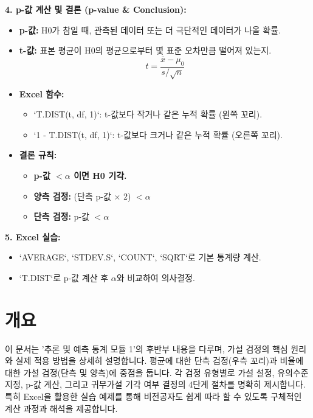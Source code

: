 \documentclass[11pt,a4paper]{article}
\begin{document}
\begin{tcolorbox}[colback=summarycolor, colframe=blue!75!black, title=\textbf{모듈 1 핵심 요약: 가설 검정의 기초}]
\textbf{4. p-값 계산 및 결론 (p-value & Conclusion):}
\begin{itemize}
    \item \textbf{p-값:} H0가 참일 때, 관측된 데이터 또는 더 극단적인 데이터가 나올 확률.
    \item \textbf{t-값:} 표본 평균이 H0의 평균으로부터 몇 표준 오차만큼 떨어져 있는지.
        \[ t = \frac{\bar{x} - \mu_0}{s / \sqrt{n}} \]
    \item \textbf{Excel 함수:}
        \begin{itemize}
            \item `T.DIST(t, df, 1)`: t-값보다 작거나 같은 누적 확률 (왼쪽 꼬리).
            \item `1 - T.DIST(t, df, 1)`: t-값보다 크거나 같은 누적 확률 (오른쪽 꼬리).
        \end{itemize}
    \item \textbf{결론 규칙:}
        \begin{itemize}
            \item \textbf{p-값 $< \alpha$ 이면 H0 기각.}
            \item \textbf{양측 검정:} (단측 p-값 $\times$ 2) $< \alpha$
            \item \textbf{단측 검정:} p-값 $< \alpha$
        \end{itemize}
\end{itemize}

\textbf{5. Excel 실습:}
\begin{itemize}
    \item `AVERAGE`, `STDEV.S`, `COUNT`, `SQRT`로 기본 통계량 계산.
    \item `T.DIST`로 p-값 계산 후 $\alpha$와 비교하여 의사결정.
\end{itemize}
\end{tcolorbox}

\newpage

\newpage
\section*{개요}
이 문서는 '추론 및 예측 통계 모듈 1'의 후반부 내용을 다루며, 가설 검정의 핵심 원리와 실제 적용 방법을 상세히 설명합니다. 평균에 대한 단측 검정(우측 꼬리)과 비율에 대한 가설 검정(단측 및 양측)에 중점을 둡니다. 각 검정 유형별로 가설 설정, 유의수준 지정, p-값 계산, 그리고 귀무가설 기각 여부 결정의 4단계 절차를 명확히 제시합니다. 특히 Excel을 활용한 실습 예제를 통해 비전공자도 쉽게 따라 할 수 있도록 구체적인 계산 과정과 해석을 제공합니다.
\end{document}
